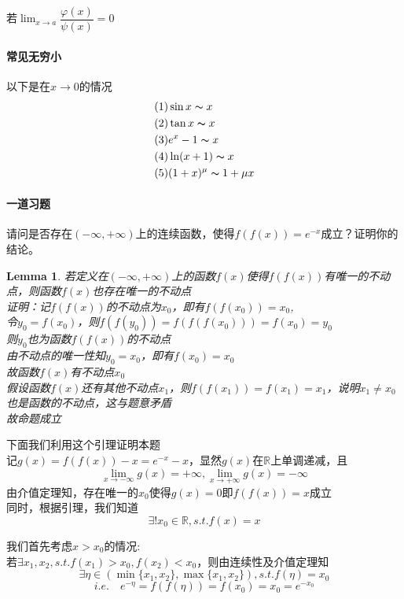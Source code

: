 \documentclass[11pt,hyperref,a4paper,UTF8]{ctexart}
\newtheorem{lemma}{Lemma}[subsection]
\begin{document}
\begin{CJK}{UTF8}{gkai}
若$\lim_{x\to a}\dfrac{\varphi(x)}{\psi(x)}=0$\\

\paragraph{常见无穷小\\}
以下是在$x\to 0$的情况
\[
\begin{aligned}
&(1) \sin x\thicksim x\\
&(2) \tan x\thicksim x\\
&(3) e^x-1\thicksim x\\
&(4) \ln(x+1)\thicksim x\\
&(5) (1+x)^\mu\thicksim 1+\mu x\\
\end{aligned}
\]
\paragraph{一道习题\\}
请问是否存在$(-\infty,+\infty)$上的连续函数，使得$f(f(x))=e^{-x}$成立？证明你的结论。\\
\begin{lemma}
若定义在$(-\infty,+\infty)$上的函数$f(x)$使得$f(f(x))$有唯一的不动点，则函数$f(x)$也存在唯一的不动点\\
证明：记$f(f(x))$的不动点为$x_0$，即有$f(f(x_0))=x_0$,\\
令$y_0=f(x_0)$，则$f(f(y_0))=f(f(f(x_0)))=f(x_0)=y_0$\\
则$y_0$也为函数$f(f(x))$的不动点\\
由不动点的唯一性知$y_0=x_0$，即有$f(x_0)=x_0$\\
故函数$f(x)$有不动点$x_0$\\
假设函数$f(x)$还有其他不动点$x_1$，则$f(f(x_1))=f(x_1)=x_1$，说明$x_1\neq x_0 $也是函数的不动点，这与题意矛盾\\
故命题成立\\
\end{lemma}
下面我们利用这个引理证明本题\\

记$g(x)=f(f(x))-x=e^{-x}-x$，显然$g(x)$在$\mathbb{R}$上单调递减，且
\[\lim_{x\to -\infty}g(x)=+\infty,\lim_{x\to +\infty}g(x)=-\infty\]
由介值定理知，存在唯一的$x_0$使得$g(x)=0$即$f(f(x))=x$成立\\
同时，根据引理，我们知道
\[\exists ! x_0 \in\mathbb{R},s.t. f(x)=x\]

我们首先考虑$x>x_0$的情况:\\
若$\exists x_1,x_2,s.t.f(x_1)>x_0,f(x_2)<x_0$，则由连续性及介值定理知
\[\exists \eta\in(\min\{x_1,x_2\},\max\{x_1,x_2\}),s.t. f(\eta)=x_0\]\[i.e.\quad e^{-\eta}=f(f(\eta))=f(x_0)=x_0=e^{-x_0}\]


\end{CJK}
\end{document}
